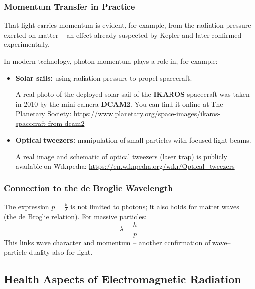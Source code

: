 \subsubsection{Momentum Transfer in Practice}

That light carries momentum is evident, for example, from the radiation pressure exerted on matter – an effect already suspected by Kepler and later confirmed experimentally.

In modern technology, photon momentum plays a role in, for example:
\begin{itemize}
	\item \textbf{Solar sails:} using radiation pressure to propel spacecraft.
	\begin{tcolorbox}[hinweisbox, title=Real-World Image Material]
		\label{keybox:RealesBildmaterial}
		A real photo of the deployed solar sail of the \textbf{IKAROS} spacecraft was taken in 2010 by the mini camera \textbf{DCAM2}.  
		You can find it online at The Planetary Society:  
		\url{https://www.planetary.org/space-images/ikaros-spacecraft-from-dcam2}
	\end{tcolorbox}
	\item \textbf{Optical tweezers:} manipulation of small particles with focused light beams.
	\begin{tcolorbox}[hinweisbox, title=Image Material for Optical Tweezers]
		\label{box:Manipulation kleiner Partikel}
		A real image and schematic of optical tweezers (laser trap) is publicly available on Wikipedia:  
		\url{https://en.wikipedia.org/wiki/Optical_tweezers}
	\end{tcolorbox}
\end{itemize}

\subsubsection{Connection to the de Broglie Wavelength}

The expression \( p = \tfrac{h}{\lambda} \) is not limited to photons; it also holds for matter waves (the de Broglie relation). For massive particles:
$$
\lambda = \frac{h}{p}
$$
This links wave character and momentum – another confirmation of wave–particle duality also for light.

\subsection{Health Aspects of Electromagnetic Radiation}

